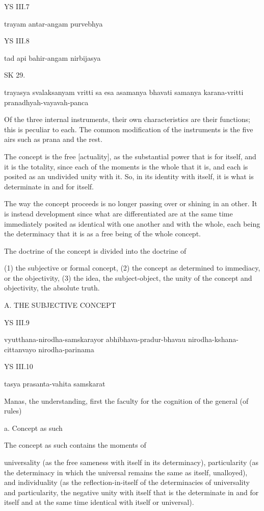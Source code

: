 YS III.7

trayam antar-angam purvebhya

YS III.8

tad api bahir-angam nirbijasya

SK 29.

trayasya svalaksanyam vritti sa esa asamanya bhavati
samanya karana-vritti pranadhyah-vayavah-panca

Of the three internal instruments, their own characteristics are their functions;
this is peculiar to each. The common modification of the instruments is the five airs
such as prana and the rest.

The concept is the free [actuality], as the substantial power that is for itself,
and it is the totality, since each of the moments is the whole that it is,
and each is posited as an undivided unity with it.
So, in its identity with itself, it is what is determinate in and for itself.

The way the concept proceeds is no longer passing over or shining in an other.
It is instead development since what are differentiated are at the same time
immediately posited as identical with one another and with the whole,
each being the determinacy that it is as a free being of the whole concept.

The doctrine of the concept is divided into the doctrine of

(1) the subjective or formal concept,
(2) the concept as determined to immediacy, or the objectivity,
(3) the idea, the subject-object, the unity of the concept and objectivity,
the absolute truth.

A. THE SUBJECTIVE CONCEPT

YS III.9

vyutthana-nirodha-samskarayor abhibhava-pradur-bhavau nirodha-kshana-cittanvayo nirodha-parinama

YS III.10

tasya prasanta-vahita samskarat

Manas, the understanding, first the faculty for the cognition of the general (of rules)

a. Concept as such

The concept as such contains the moments of

universality
(as the free sameness with itself in its determinacy),
particularity
(as the determinacy in which the universal remains the same as itself, unalloyed),
and individuality
(as the reflection-in-itself of the determinacies of universality and particularity,
the negative unity with itself that is the determinate in and for itself
and at the same time identical with itself or universal).

